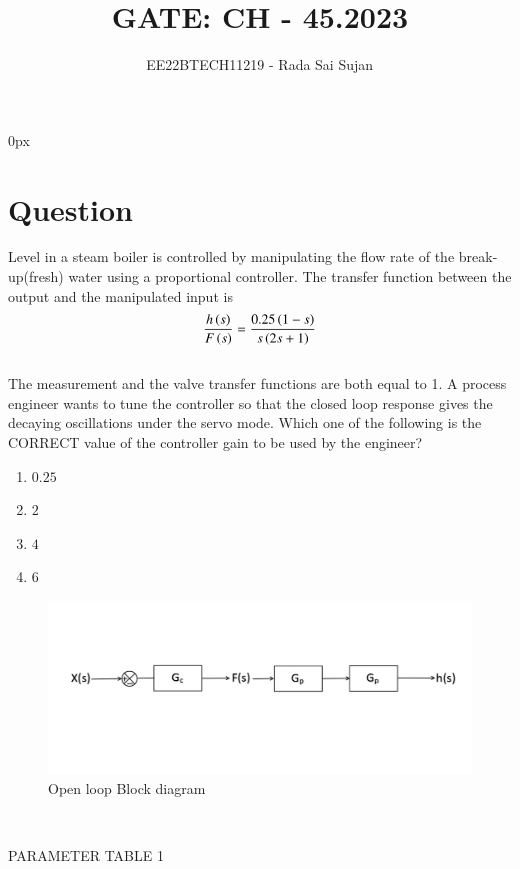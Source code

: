 \documentclass[journal,12pt,twocolumn]{IEEEtran}
\theoremstyle{remark}
\begin{document}
\parindent 0px

\title{GATE: CH - 45.2023}
\author{EE22BTECH11219 - Rada Sai Sujan$^{}$%
}
\maketitle
\newpage
\bigskip
\section*{Question}
Level  in a steam boiler is controlled by manipulating the flow rate  of the break-up(fresh) water using a proportional  controller. The transfer function between the output and the manipulated input is   \\
$$ \frac{h\left(s\right)}{F\left(s\right)}=\frac{0.25\left(1-s\right)}{s\left(2s+1\right)} $$   \\
The measurement and the valve transfer functions are both equal to 1. A process engineer wants to tune the controller so that the closed loop response gives the decaying oscillations under the servo mode. Which one of the following is the CORRECT value of the controller gain to be used by the engineer? \\
\begin{enumerate}[label=(\alph*)]
    \item $0.25$
    \item $2$
    \item $4$
    \item $6$
\end{enumerate}
\solution
\begin{figure}[ht]
    \centering
    \includegraphics[width=\columnwidth]{figs/c.png}
    \caption{Open loop Block diagram}
    \label{fig:ch.45.1}
\end{figure}    \\
\begin{table}[ht]
    \centering
    
    \caption{PARAMETER TABLE 1}
    \label{tab:ch.45.1}
\end{table} \\
\end{document}
